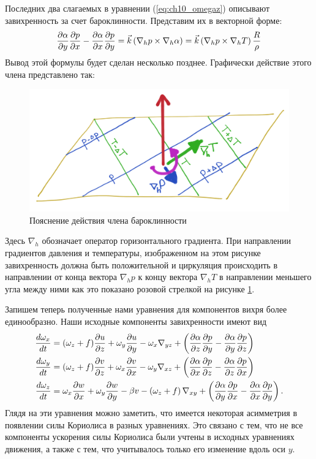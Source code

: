 Последних два слагаемых в уравнении (\ref{eq:ch10_omegaz}) описывают завихренность за счет бароклинности. Представим их в векторной форме:
\begin{equation*}
    \displaystyle\frac{\partial \alpha}{\partial y}\displaystyle\frac{\partial p}{\partial x}-\displaystyle\frac{\partial \alpha}{\partial x}\displaystyle\frac{\partial p}{\partial y}=\vec{k} \left( \nabla_hp \times \nabla_h\alpha \right) = \vec{k} \left( \nabla_hp \times \nabla_hT \right) \frac{R}{\rho}  
\end{equation*}
{\color{red}Вывод этой формулы будет сделан несколько позднее.} Графически действие этого члена представлено так: 
    \begin{figure}[h]
    \centering
    \includegraphics[width=0.9\linewidth]{pics/ch10.3.png}
    \caption{\label{fig:ch10.3}
    Пояснение действия члена бароклинности
    }
    \end{figure}    
Здесь $\nabla_h$ обозначает оператор горизонтального градиента. При направлении градиентов давления и температуры, изображенном на этом рисунке завихренность должна быть положительной и циркуляция происходить в направлении от конца вектора $\nabla_hp$ к концу вектора $\nabla_hT$ в направлении {\color{red}меньшего угла между ними} как это показано розовой стрелкой на рисунке \ref{fig:ch10.3}. 

Запишем теперь полученные нами уравнения для компонентов вихря более единообразно. Наши исходные компоненты завихренности имеют вид
\begin{align}
    \displaystyle\frac{d \omega_x}{d t}&= (\omega_z+f)\displaystyle\frac{\partial u}{\partial z} + \omega_y\displaystyle\frac{\partial u}{\partial y}
    -\omega_x\nabla_{yz}+\left( \displaystyle\frac{\partial \alpha}{\partial z}\displaystyle\frac{\partial p}{\partial y} - \displaystyle\frac{\partial \alpha}{\partial y}\displaystyle\frac{\partial p}{\partial z} \right) \label{eq:ch10_omegax1} \\
    \displaystyle\frac{d \omega_y}{d t}&=(\omega_z+f)\displaystyle\frac{\partial v}{\partial z} + \omega_x\displaystyle\frac{\partial v}{\partial x}
    -\omega_y\nabla_{xz}+\left( \displaystyle\frac{\partial \alpha}{\partial x}\displaystyle\frac{\partial p}{\partial z} - \displaystyle\frac{\partial \alpha}{\partial z}\displaystyle\frac{\partial p}{\partial x} \right) \label{eq:ch10_omegay1} \\
    \displaystyle\frac{d \omega_z}{d t}&=
    \omega_x\displaystyle\frac{\partial w}{\partial x} + \omega_y\displaystyle\frac{\partial w}{\partial y} -\beta v - 
    \left( \omega_z + f \right) \nabla_{xy}+
    \left( \displaystyle\frac{\partial \alpha}{\partial y}\displaystyle\frac{\partial p}{\partial x} - \displaystyle\frac{\partial \alpha}{\partial x}\displaystyle\frac{\partial p}{\partial y} \right) \label{eq:ch10_omegaz1}.
\end{align}
Глядя на эти уравнения можно заметить, что имеется некоторая асимметрия в появлении силы Кориолиса в разных уравнениях. Это связано с тем, что не все компоненты ускорения силы Кориолиса были учтены в исходных уравнениях движения, а также с тем, что учитывалось только его изменение вдоль оси $y$. 

